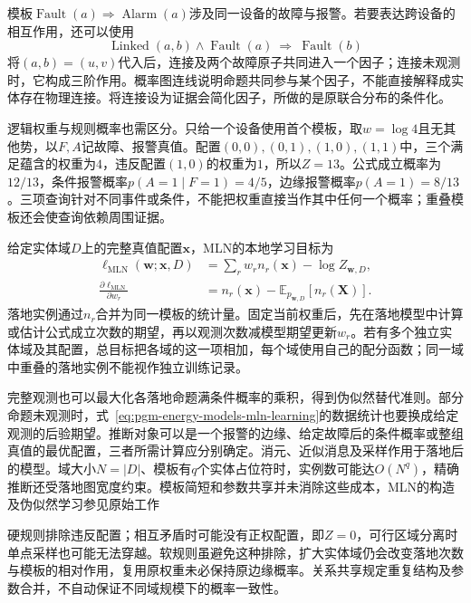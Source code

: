 模板$\operatorname{Fault}(a)\Rightarrow\operatorname{Alarm}(a)$涉及同一设备的故障与报警。若要表达跨设备的相互作用，还可以使用
\[
  \operatorname{Linked}(a,b)\land\operatorname{Fault}(a)
       \ \Rightarrow\ \operatorname{Fault}(b)
\]
将$(a,b)=(u,v)$代入后，连接及两个故障原子共同进入一个因子；连接未观测时，它构成三阶作用。概率图连线说明命题共同参与某个因子，不能直接解释成实体存在物理连接。将连接设为证据会简化因子，所做的是原联合分布的条件化。

逻辑权重与规则概率也需区分。只给一个设备使用首个模板，取$w=\log4$且无其他势，以$F,A$记故障、报警真值。配置$(0,0),(0,1),(1,0),(1,1)$中，三个满足蕴含的权重为$4$，违反配置$(1,0)$的权重为$1$，所以$Z=13$。公式成立概率为$12/13$，条件报警概率$p(A=1\mid F=1)=4/5$，边缘报警概率$p(A=1)=8/13$。三项查询针对不同事件或条件，不能把权重直接当作其中任何一个概率；重叠模板还会使查询依赖周围证据。

给定实体域$D$上的完整真值配置$\bm{x}$，MLN的本地学习目标为
\begin{equation}
  \begin{aligned}
    \ell_{\mathrm{MLN}}(\bm{w};\bm{x},D)
      &=\sum_r w_r n_r(\bm{x})-\log Z_{\bm{w},D},\\
    \frac{\partial\ell_{\mathrm{MLN}}}{\partial w_r}
      &=n_r(\bm{x})-\mathbb{E}_{p_{\bm{w},D}}[n_r(\bm{X})].
  \end{aligned}
  \label{eq:pgm-energy-models-mln-learning}
\end{equation}
落地实例通过$n_r$合并为同一模板的统计量。固定当前权重后，先在落地模型中计算或估计公式成立次数的期望，再以观测次数减模型期望更新$w_r$。若有多个独立实体域及其配置，总目标把各域的这一项相加，每个域使用自己的配分函数；同一域中重叠的落地实例不能视作独立训练记录。

完整观测也可以最大化各落地命题满条件概率的乘积，得到伪似然替代准则。部分命题未观测时，式~\eqref{eq:pgm-energy-models-mln-learning}的数据统计也要换成给定观测的后验期望。推断对象可以是一个报警的边缘、给定故障后的条件概率或整组真值的最优配置，三者所需计算应分别确定。消元、近似消息及采样作用于落地后的模型。域大小$N=|D|$、模板有$q$个实体占位符时，实例数可能达$O(N^q)$，精确推断还受落地图宽度约束。模板简短和参数共享并未消除这些成本，MLN的构造及伪似然学习参见原始工作

硬规则排除违反配置；相互矛盾时可能没有正权配置，即$Z=0$，可行区域分离时单点采样也可能无法穿越。软规则虽避免这种排除，扩大实体域仍会改变落地次数与模板的相对作用，复用原权重未必保持原边缘概率。关系共享规定重复结构及参数合并，不自动保证不同域规模下的概率一致性。

